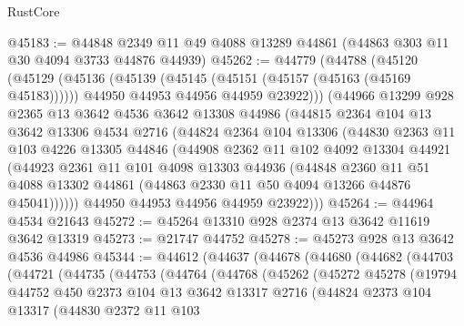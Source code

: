 \begin{lexlean}{RustCore}
\begin{coremodule}
@45183 := @44848 @2349 @11 @49 @4088 @13289 @44861 (@44863 @303 @11 @30 @4094 @3733 @44876 @44939)
@45262 := @44779
    (@44788
      (@45120
        (@45129
          (@45136
            (@45139 (@45145 (@45151 (@45157 (@45163 (@45169 @45183))))))
            @44950
            @44953
            @44956
            @44959
            @23922)))
      (@44966
        @13299
        @928
        @2365
        @13
        @3642
        @4536
        @3642
        @13308
        @44986
        (@44815
          @2364
          @104
          @13
          @3642
          @13306
          @4534
          @2716
          (@44824
            @2364
            @104
            @13306
            (@44830
              @2363
              @11
              @103
              @4226
              @13305
              @44846
              (@44908
                @2362
                @11
                @102
                @4092
                @13304
                @44921
                (@44923
                  @2361
                  @11
                  @101
                  @4098
                  @13303
                  @44936
                  (@44848
                    @2360
                    @11
                    @51
                    @4088
                    @13302
                    @44861
                    (@44863 @2330 @11 @50 @4094 @13266 @44876 @45041))))))
          @44950
          @44953
          @44956
          @44959
          @23922)))
@45264 := @44964 @4534 @21643
@45272 := @45264 @13310 @928 @2374 @13 @3642 @11619 @3642 @13319
@45273 := @21747 @44752
@45278 := @45273 @928 @13 @3642 @4536 @44986
@45344 := @44612
    (@44637
      (@44678
        (@44680
          (@44682
            (@44703
              (@44721
                (@44735
                  (@44753
                    (@44764
                      (@44768
                        (@45262
                          (@45272
                            @45278
                            (@19794
                              @44752
                              @450
                              @2373
                              @104
                              @13
                              @3642
                              @13317
                              @2716
                              (@44824
                                @2373
                                @104
                                @13317
                                (@44830
                                  @2372
                                  @11
                                  @103

\end{coremodule}
\end{lexlean}
